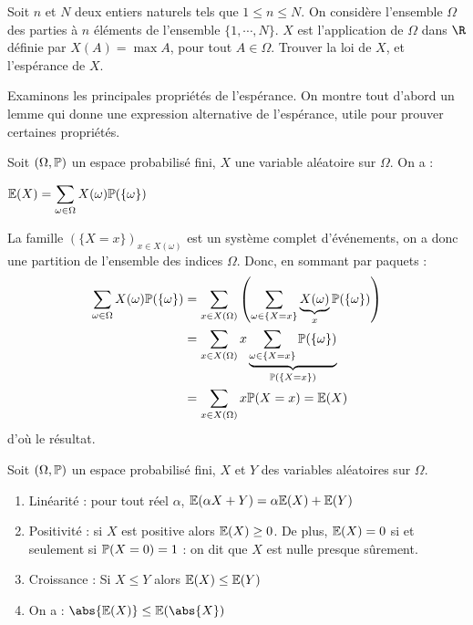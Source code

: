\documentclass[12pt,a4paper]{report}
\begin{document}
\begin{exemple}[Exercice 11]{}
Soit $n$ et $N$ deux entiers naturels tels que $1 \le n \le N$. On considère l'ensemble $\Omega$ des parties à $n$ éléments de l'ensemble $\{1,\cdots,N\}$. $X$ est l'application de $\Omega$ dans $\R$ définie par $X(A) = \max A$, pour tout $A \in \Omega$. Trouver la loi de $X$, et l'espérance de $X$.
\end{exemple}

Examinons les principales propriétés de l'espérance. On montre tout d'abord un lemme qui donne une expression alternative de l'espérance, utile pour prouver certaines propriétés.

\begin{lemme}{}{}
Soit $(\Omega,\mathbb{P})$ un espace probabilisé fini, $X$ une variable aléatoire sur $\Omega$. On a :
\begin{center}
$\mathbb{E}(X) = \displaystyle \sum_{\omega \in \Omega} X(\omega) \mathbb{P}(\{\omega\})$
\end{center}
\end{lemme}

\begin{demo}{}
La famille $(\{X=x\})_{x \in X(\omega)}$ est un système complet d'événements, on a donc une partition de l'ensemble des indices $\Omega$. Donc, en sommant par paquets :
\begin{align*}
\sum_{\omega \in \Omega} X(\omega) \mathbb{P}(\{\omega\}) &= \sum_{x \in X(\Omega)} \left(\sum_{\omega \in \{X=x\}} \underbrace{X(\omega)}_{x}\mathbb{P}(\{\omega\})\right) \\
&= \sum_{x \in X(\Omega)} x \underbrace{\sum_{\omega \in \{X=x\}} \mathbb{P}(\{\omega\})}_{\mathbb{P}(\{X=x\})} \\
&= \sum_{x \in X(\Omega)} x \mathbb{P}(X=x) = \mathbb{E}(X)
\end{align*}
d'où le résultat.
\end{demo}

\begin{theoreme}{}{}
Soit $(\Omega, \mathbb{P})$ un espace probabilisé fini, $X$ et $Y$ des variables aléatoires sur $\Omega$.
\begin{enumerate}
	\item Linéarité : pour tout réel $\alpha$, $\mathbb{E}(\alpha X + Y) = \alpha \mathbb{E}(X) + \mathbb{E}(Y)$
	\item Positivité : si $X$ est positive alors $\mathbb{E}(X) \ge 0$. De plus, $\mathbb{E}(X) = 0$ si et seulement si $\mathbb{P}(X=0) = 1$ : on dit que $X$ est nulle presque sûrement.
	\item Croissance : Si $X \le Y$ alors $\mathbb{E}(X) \le \mathbb{E}(Y)$
	\item On a : $\abs{\E(X)} \le \E(\abs{X})$
\end{enumerate}
\end{theoreme}
\end{document}
